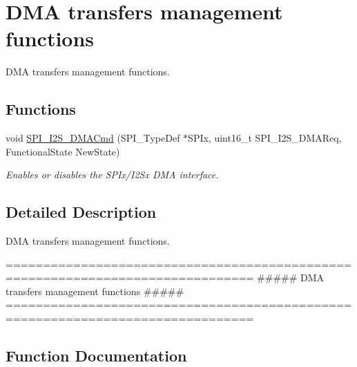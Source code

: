 \hypertarget{group___s_p_i___group4}{}\section{D\+MA transfers management functions}
\label{group___s_p_i___group4}


D\+MA transfers management functions.  


\subsection*{Functions}
\begin{DoxyCompactItemize}
\item 
void \mbox{\hyperlink{group___s_p_i___group4_gabed5b91a8576e6d578f364cc0e807e4a}{S\+P\+I\+\_\+\+I2\+S\+\_\+\+D\+M\+A\+Cmd}} (S\+P\+I\+\_\+\+Type\+Def $\ast$S\+P\+Ix, uint16\+\_\+t S\+P\+I\+\_\+\+I2\+S\+\_\+\+D\+M\+A\+Req, Functional\+State New\+State)
\begin{DoxyCompactList}\small\item\em Enables or disables the S\+P\+Ix/\+I2\+Sx D\+MA interface. \end{DoxyCompactList}\end{DoxyCompactItemize}


\subsection{Detailed Description}
D\+MA transfers management functions. 

\begin{DoxyVerb} ===============================================================================
                   ##### DMA transfers management functions #####
 ===============================================================================  \end{DoxyVerb}
 

\subsection{Function Documentation}
\mbox{\label{group___s_p_i___group4_gabed5b91a8576e6d578f364cc0e807e4a}} 

